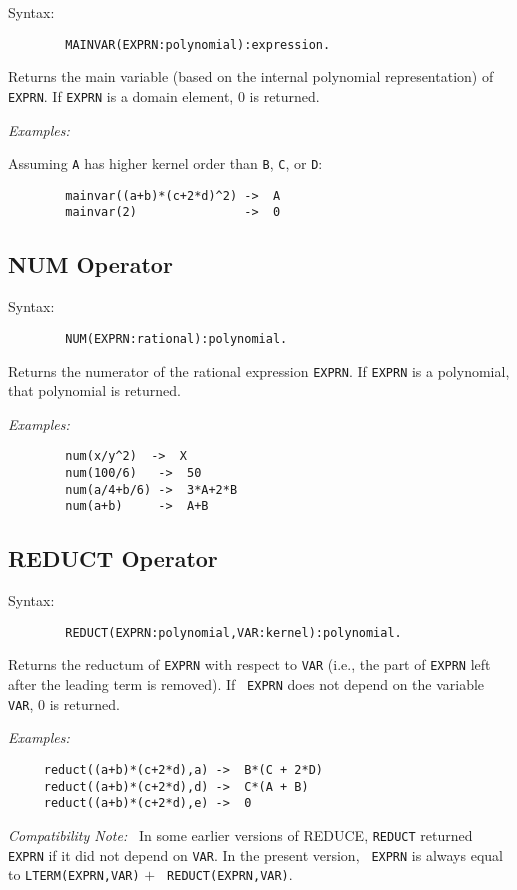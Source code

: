 \documentclass[11pt,letterpaper]{book}
\makeatletter
\newcommand{\underscore}{\_}
\newcommand{\ttindex}[1]{{\renewcommand{\_}{\protect\underscore}%
                          \index{#1@{\tt #1}}}}
\newcommand{\COMPATNOTE}{{\em Compatibility Note:\ }}
\makeatother
\begin{document}
Syntax:
{\small\begin{verbatim}
        MAINVAR(EXPRN:polynomial):expression.
\end{verbatim}}
Returns the main variable (based on the internal polynomial representation)
of {\tt EXPRN}. If {\tt EXPRN} is a domain element, 0 is returned.

{\it Examples:}

Assuming {\tt A} has higher kernel order than {\tt B}, {\tt C}, or {\tt D}:
{\small\begin{verbatim}
        mainvar((a+b)*(c+2*d)^2) ->  A
        mainvar(2)               ->  0
\end{verbatim}}

\subsection{NUM Operator}\ttindex{NUM}

Syntax:
{\small\begin{verbatim}
        NUM(EXPRN:rational):polynomial.
\end{verbatim}}
Returns the numerator of the rational expression {\tt EXPRN}.  If {\tt EXPRN}
is a polynomial, that polynomial is returned.

{\it Examples:}
{\small\begin{verbatim}
        num(x/y^2)  ->  X
        num(100/6)   ->  50
        num(a/4+b/6) ->  3*A+2*B
        num(a+b)     ->  A+B
\end{verbatim}}

\subsection{REDUCT Operator}\ttindex{REDUCT}

Syntax:
{\small\begin{verbatim}
        REDUCT(EXPRN:polynomial,VAR:kernel):polynomial.
\end{verbatim}}
Returns the reductum of {\tt EXPRN} with respect to {\tt VAR} (i.e., the
part of {\tt EXPRN} left after the leading term is removed).  If {\tt
EXPRN} does not depend on the variable {\tt VAR}, 0 is returned.

{\it Examples:}
{\small\begin{verbatim}
     reduct((a+b)*(c+2*d),a) ->  B*(C + 2*D)
     reduct((a+b)*(c+2*d),d) ->  C*(A + B)
     reduct((a+b)*(c+2*d),e) ->  0
\end{verbatim}}

{\COMPATNOTE} In some earlier versions of REDUCE, {\tt REDUCT} returned
{\tt EXPRN} if it did not depend on {\tt VAR}.  In the present version, {\tt
EXPRN} is always equal to {\tt LTERM(EXPRN,VAR)} $+$ {\tt
REDUCT(EXPRN,VAR)}.
\end{document}
